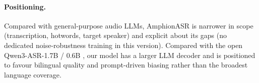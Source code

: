 \paragraph{Positioning.}
Compared with general-purpose audio LLMs, AmphionASR is narrower in
scope (transcription, hotwords, target speaker) and explicit about its
gaps (no dedicated noise-robustness training in this version). Compared
with the open Qwen3-ASR-1.7B / 0.6B \cite{qwen2025qwen3asr}, our model
has a larger LLM decoder and is positioned to favour bilingual quality
and prompt-driven biasing rather than the broadest language coverage.
